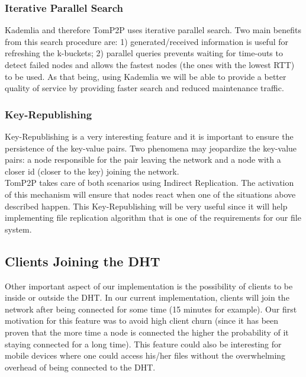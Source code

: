 \documentclass[times,9pt,article]{llncs}
\begin{document}
\subsubsection{Iterative Parallel Search}
Kademlia and therefore TomP2P uses iterative parallel search. Two main benefits from this search procedure are: 1) generated/received information is useful for  refreshing the k-buckets; 2) parallel queries prevents waiting for time-outs to  detect failed nodes and allows the fastest nodes (the ones with the lowest RTT)  to be used. As that being, using Kademlia we will be able to provide a better  quality of service by providing faster search and reduced maintenance traffic.

\subsubsection{Key-Republishing}
Key-Republishing is a very interesting feature and it is important to ensure the  persistence of the key-value pairs. Two phenomena may jeopardize the key-value pairs: a node responsible for the pair leaving the network and a node with a closer id (closer to the key) joining the network. \\
TomP2P takes care of both scenarios using Indirect Replication. The activation of this mechanism will ensure that nodes react when one of the situations above described happen. This Key-Republishing will be very useful since it will help implementing file replication algorithm that is one of the requirements for our file system.

\subsection{Clients Joining the DHT}
Other important aspect of our implementation is the possibility of clients to be inside or outside the DHT. In our current implementation, clients will join the network after being connected for some time (15 minutes for example). Our first motivation for this feature was to avoid high client churn (since it has been proven that the more time a node is connected the higher the probability of it staying connected for a long time). This feature could also be interesting for mobile devices where one could access his/her files without the overwhelming overhead of being connected to the DHT.
\end{document}
